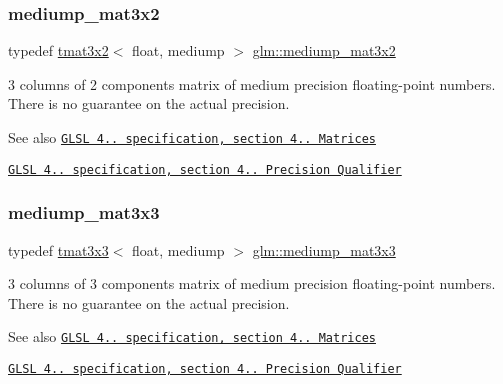 \subsubsection{\texorpdfstring{mediump\+\_\+mat3x2}{mediump\_mat3x2}}
{\footnotesize\ttfamily typedef \hyperlink{structglm_1_1tmat3x2}{tmat3x2}$<$ float, mediump $>$ \hyperlink{group__core__precision_ga2237b9bb71ea5b0d2ae07f9315ccdc28}{glm\+::mediump\+\_\+mat3x2}}

3 columns of 2 components matrix of medium precision floating-\/point numbers. There is no guarantee on the actual precision.

\begin{DoxySeeAlso}{See also}
\href{http://www.opengl.org/registry/doc/GLSLangSpec.4.20.8.pdf}{\tt G\+L\+SL 4.. specification, section 4.. Matrices} 

\href{http://www.opengl.org/registry/doc/GLSLangSpec.4.20.8.pdf}{\tt G\+L\+SL 4.. specification, section 4.. Precision Qualifier} 
\end{DoxySeeAlso}
\mbox{\label{group__core__precision_gae75115c4c4608fccf6827f7a25d95885}} 
\subsubsection{\texorpdfstring{mediump\+\_\+mat3x3}{mediump\_mat3x3}}
{\footnotesize\ttfamily typedef \hyperlink{structglm_1_1tmat3x3}{tmat3x3}$<$ float, mediump $>$ \hyperlink{group__core__precision_gae75115c4c4608fccf6827f7a25d95885}{glm\+::mediump\+\_\+mat3x3}}

3 columns of 3 components matrix of medium precision floating-\/point numbers. There is no guarantee on the actual precision.

\begin{DoxySeeAlso}{See also}
\href{http://www.opengl.org/registry/doc/GLSLangSpec.4.20.8.pdf}{\tt G\+L\+SL 4.. specification, section 4.. Matrices} 

\href{http://www.opengl.org/registry/doc/GLSLangSpec.4.20.8.pdf}{\tt G\+L\+SL 4.. specification, section 4.. Precision Qualifier} 
\end{DoxySeeAlso}
\mbox{\label{group__core__precision_ga0ea90a4a20efa6c104c7ad21144ccefe}} 
